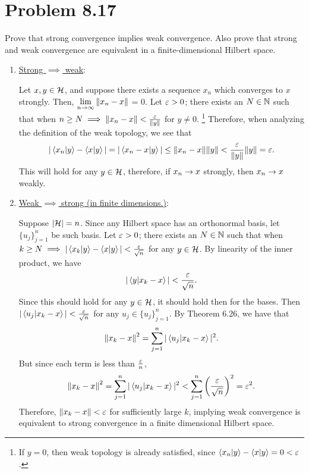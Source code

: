 \newpage
\section{Problem 8.17}
Prove that strong convergence implies weak convergence. Also prove that strong and weak convergence are equivalent in a finite-dimensional Hilbert space.
\partbreak
\begin{solution}

    \begin{enumerate}
        \item[] \underline{Strong $\implies$ weak}:

        \hop
        Let $x, y \in \mathcal{H}$, and suppose there exists a sequence $x_n$ which converges to $x$ strongly. Then, $\lim\limits_{n\to\infty} \norm{x_n - x}$ = 0. Let $\varepsilon > 0$; there exists an $N \in \mathbb{N}$ such that when $n \geq N \implies \norm{x_n - x} < \frac{\varepsilon}{\norm{y}}$ for $y \neq 0$. \footnote{If $y = 0$, then weak topology is already satisfied, since $\braket{x_n}{y} - \braket{x}{y} = 0 < \varepsilon$.} Therefore, when analyzing the definition of the weak topology, we see that 
        \[|\braket{x_n}{y} - \braket{x}{y}| = |\braket{x_n - x}{y}| \leq \norm{x_n - x} \norm{y} < \frac{\varepsilon}{\norm{y}}\norm{y} = \varepsilon.\]
        This will hold for any $y \in \mathcal{H}$, therefore, if $x_n \rightarrow x$ strongly, then $x_n \rightarrow x$ weakly. 

        \item[] \underline{Weak $\implies$ strong (in finite dimensions.)}:

        \hop
        Suppose $|\mathcal{H}| = n$. Since any Hilbert space has an orthonormal basis, let $\{u_j\}_{j = 1}^{n}$ be such basis. Let $\varepsilon > 0$; there exists an $N \in \mathbb{N}$ such that when $k \geq N \implies |\braket{x_k}{y} -\braket{x}{y}| < \frac{\varepsilon}{\sqrt{n}}$ for any $y \in \mathcal{H}$. By linearity of the inner product, we have
        \[|\braket{y}{x_k - x}| <\frac{\varepsilon}{\sqrt{n}}.\]
        Since this should hold for any $y \in \mathcal{H}$, it should hold then for the bases. Then $|\braket{u_j}{x_k - x}| <\frac{\varepsilon}{\sqrt{n}}$ for any $u_j \in \{u_j\}_{j = 1}^n$. By Theorem 6.26, we have that 
        \[\norm{x_k - x}^2 = \sum_{j = 1}^n |\braket{u_j}{x_k - x}|^2.\]
        But since each term is less than $\frac{\varepsilon}{n}$, 
        \[\norm{x_k - x}^2 = \sum_{j = 1}^n |\braket{u_j}{x_k - x}|^2 < \sum_{j = 1}^n \left(\frac{\varepsilon}{\sqrt{n}}\right)^2 = \varepsilon^2.\]
        Therefore, $\norm{x_k - x} < \varepsilon$ for sufficiently large $k$, implying weak convergence is equivalent to strong convergence in a finite dimensional Hilbert space.
    \end{enumerate}
\end{solution}


